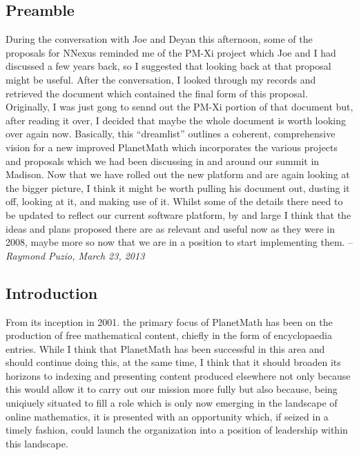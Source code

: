 \subsection{Preamble}

During the conversation with Joe and Deyan this afternoon, some of the
proposals for NNexus reminded me of the PM-Xi project which Joe and I
had discussed a few years back, so I suggested that looking back at
that proposal might be useful. After the conversation, I looked
through my records and retrieved the document which contained the
final form of this proposal. Originally, I was just gong to sennd out
the PM-Xi portion of that document but, after reading it over, I
decided that maybe the whole document is worth looking over again
now. Basically, this ``dreamlist'' outlines a coherent, comprehensive
vision for a new improved PlanetMath which incorporates the various
projects and proposals which we had been discussing in and around our
summit in Madison. Now that we have rolled out the new platform and
are again looking at the bigger picture, I think it might be worth
pulling his document out, dusting it off, looking at it, and making
use of it.  Whilst some of the details there need to be updated to
reflect our current software platform, by and large I think that the
ideas and plans proposed there are as relevant and useful now as they
were in 2008, maybe more so now that we are in a position to start
implementing them. -- \emph{Raymond Puzio, March 23, 2013}

\subsection{Introduction}

From its inception in 2001. the primary focus of PlanetMath has been on
the production of free mathematical content, chiefly in the form of
encyclopaedia entries. While I think that PlanetMath has been successful
in this area and should continue doing this, at the same time, I think
that it should broaden its horizons to indexing and presenting content
produced elsewhere not only because this would allow it to carry out our
mission more fully but also because, being uniqiuely situated to fill a
role which is only now emerging in the landscape of online mathematics,
it is presented with an opportunity which, if seized in a timely
fashion, could launch the organization into a position of leadership
within this landscape.

